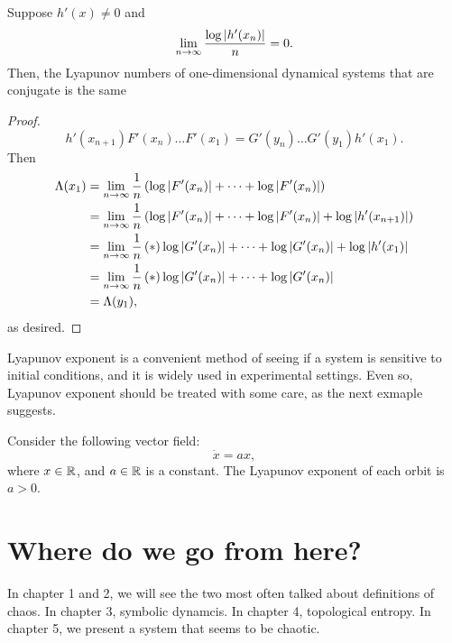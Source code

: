 \documentclass[12pt,twoside,draft]{book}
\begin{document}
\begin{proposition}
  Suppose $h'(x) \neq 0$ and
  \begin{equation*}
    \lim\limits_{n\to \infty} \frac{\log\left | h'(x_n) \right |}{n} = 0.
  \end{equation*}
  Then, the Lyapunov numbers of one-dimensional dynamical systems that are conjugate is the same 
  \label{prop:lyap-conj}
  \begin{proof}
    \begin{equation*}
      h'(x_{n+1})F'(x_n)\ldots F'(x_1) = G'(y_n)\ldots G'(y_1)h'(x_1).
    \end{equation*}
    Then 
    \begin{align*}
      \Lambda(x_1) &= \lim\limits_{n\to \infty} \frac{1}{n}\left ( \log\left | F'(x_n) \right | + \cdots + \log\left | F'(x_n) \right |  \right ) \\
      &= \lim\limits_{n\to \infty} \frac{1}{n}\left(\log\left | F'(x_n) \right | + \cdots + \log\left | F'(x_n) \right | + \log\left | h'(x_{n+1}) \right |\right) \\
      &= \lim\limits_{n\to \infty} \frac{1}{n} \left ( * \right ){ \log\left | G'(x_n) \right | + \cdots + \log\left | G'(x_n) \right | + \log\left | h'(x_1) \right | } \\
      &= \lim\limits_{n\to \infty} \frac{1}{n} \left ( * \right ){ \log\left | G'(x_n) \right | + \cdots + \log\left | G'(x_n) \right | } \\
      &= \Lambda(y_1),
    \end{align*} 
    as desired.
  \end{proof}
\end{proposition}
Lyapunov exponent is a convenient method of seeing if a system is sensitive to initial conditions, and it is widely used in experimental settings.
Even so, Lyapunov exponent should be treated with some care, as the next exmaple suggests.
\begin{example}
  \citep{wiggins}
  Consider the following vector field:
  \begin{equation*}
    \dot{x} = ax,
  \end{equation*}
  where $x \in \mathbb{R}$, and $a \in \mathbb{R}$ is a constant.
  The Lyapunov exponent of each orbit is $a > 0$.
\end{example}
%

\section{Where do we go from here?}
In chapter 1 and 2, we will see the two most often talked about definitions of chaos.
In chapter 3, symbolic dynamcis.
In chapter 4, topological entropy.
In chapter 5, we present a system that seems to be chaotic.
\end{document}
